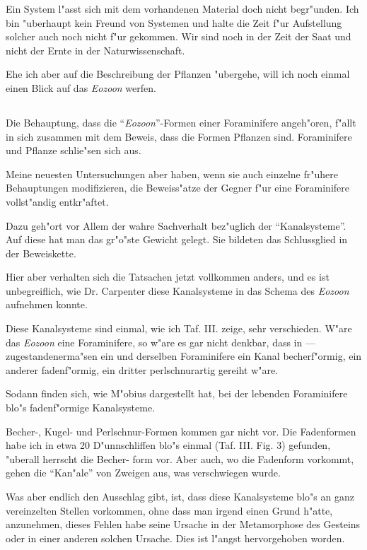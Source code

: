 \documentclass[a4paper, 11pt, oneside, german]{article}
\begin{document}
Ein System l"asst sich mit dem vorhandenen Material doch nicht begr"unden. Ich bin "uberhaupt kein Freund von Systemen und halte die Zeit f"ur Aufstellung solcher auch noch nicht f"ur gekommen. Wir sind noch in der Zeit der Saat und nicht der Ernte in der Naturwissenschaft.

Ehe ich aber auf die Beschreibung der Pflanzen "ubergehe, will ich noch einmal einen Blick auf das \emph{Eozoon} werfen.
\clearpage
\subsection{}
\paragraph{}
Die Behauptung, dass die "`\emph{Eozoon}"'-Formen einer Foraminifere angeh"oren, f"allt in sich zusammen mit dem Beweis, dass die Formen Pflanzen sind. Foraminifere und Pflanze schlie"sen sich aus.

Meine neuesten Untersuchungen aber haben, wenn sie auch einzelne fr"uhere Behauptungen modifizieren, die Beweiss"atze der Gegner f"ur eine Foraminifere vollst"andig entkr"aftet.

Dazu geh"ort vor Allem der wahre Sachverhalt bez"uglich der "`Kanalsysteme"'. Auf diese hat man das gr"o"ste Gewicht gelegt. Sie bildeten das Schlussglied in der Beweiskette.

Hier aber verhalten sich die Tatsachen jetzt vollkommen anders, und es ist unbegreiflich, wie Dr. Carpenter diese Kanalsysteme in das Schema des \emph{Eozoon} aufnehmen konnte.

Diese Kanalsysteme sind einmal, wie ich Taf. III. zeige, sehr verschieden. W"are das \emph{Eozoon} eine Foraminifere, so w"are es gar nicht denkbar, dass in --- zugestandenerma"sen ein und derselben Foraminifere ein Kanal becherf"ormig, ein anderer fadenf"ormig, ein dritter perlschnurartig gereiht w"are.

Sodann finden sich, wie M"obius dargestellt hat, bei der lebenden Foraminifere blo"s fadenf"ormige Kanalsysteme.

Becher-, Kugel- und Perlschnur-Formen kommen gar nicht vor. Die Fadenformen habe ich in etwa 20 D"unnschliffen blo"s einmal (Taf. III. Fig. 3) gefunden, "uberall herrscht die Becher- form vor. Aber auch, wo die Fadenform vorkommt, gehen die "`Kan"ale"' von Zweigen aus, was verschwiegen wurde.

Was aber endlich den Ausschlag gibt, ist, dass diese Kanalsysteme blo"s an ganz vereinzelten Stellen vorkommen, ohne dass man irgend einen Grund h"atte, anzunehmen, dieses Fehlen habe seine Ursache in der Metamorphose des Gesteins oder in einer anderen solchen Ursache. Dies ist l"angst hervorgehoben worden.
\end{document}
